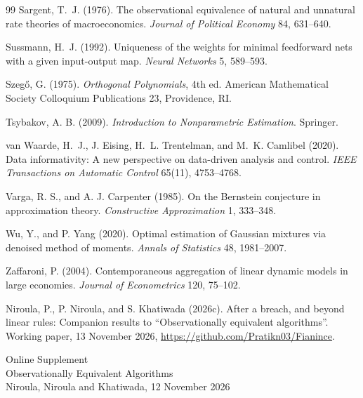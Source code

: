 \documentclass[12pt]{article}
\theoremstyle{definition}
\theoremstyle{remark}
\begin{document}
\begin{thebibliography}{99}
 Sargent, T.~J. (1976). The observational equivalence of natural and unnatural rate theories of macroeconomics. \emph{Journal of Political Economy} 84, 631--640.

 Sussmann, H.~J. (1992). Uniqueness of the weights for minimal feedforward nets with a given input-output map. \emph{Neural Networks} 5, 589--593.

 Szeg\H{o}, G. (1975). \emph{Orthogonal Polynomials}, 4th ed. American Mathematical Society Colloquium Publications 23, Providence, RI.

 Tsybakov, A. B. (2009). \emph{Introduction to Nonparametric Estimation}. Springer.

 van Waarde, H.~J., J. Eising, H.~L. Trentelman, and M.~K. Camlibel (2020). Data informativity: A new perspective on data-driven analysis and control. \emph{IEEE Transactions on Automatic Control} 65(11), 4753--4768.

 Varga, R. S., and A. J. Carpenter (1985). On the Bernstein conjecture in approximation theory. \emph{Constructive Approximation} 1, 333--348.

 Wu, Y., and P. Yang (2020). Optimal estimation of Gaussian mixtures via denoised method of moments. \emph{Annals of Statistics} 48, 1981--2007.

 Zaffaroni, P. (2004). Contemporaneous aggregation of linear dynamic models in large economies. \emph{Journal of Econometrics} 120, 75--102.

 Niroula, P., P. Niroula, and S. Khatiwada (2026c). After a breach, and beyond linear rules: Companion results to ``Observationally equivalent algorithms''. Working paper, 13 November 2026, \url{https://github.com/Pratikn03/Fianince}.


\end{thebibliography}
\appendix
\clearpage
\singlespacing\small\sloppy
\renewcommand{\topfraction}{0.9}\renewcommand{\bottomfraction}{0.8}\renewcommand{\textfraction}{0.07}\renewcommand{\floatpagefraction}{0.75}
\setcounter{page}{1}\setcounter{table}{0}\setcounter{figure}{0}
\begin{center}{\Large Online Supplement}\\[4pt]{\large Observationally Equivalent Algorithms}\\[2pt]{\normalsize Niroula, Niroula and Khatiwada, 12 November 2026}\end{center}
\end{document}
